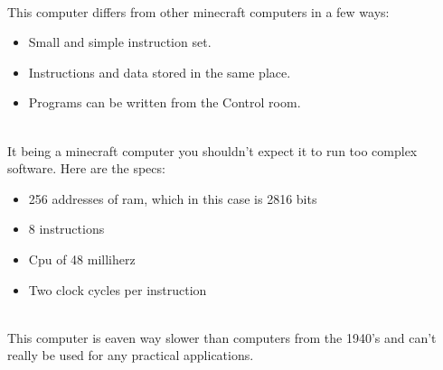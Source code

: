 \documentclass{article}
\begin{document}
~\\
This computer differs from other minecraft computers in a few ways:
\begin{itemize}
	\item Small and simple instruction set.
	\item Instructions and data stored in the same place.
	\item Programs can be written from the Control room.
\end{itemize}
~\\
It being a minecraft computer you shouldn't expect it to run too complex software. Here are the specs:
\begin{itemize}
	\item 256 addresses of ram, which in this case is 2816 bits
	\item 8 instructions
	\item Cpu of 48 milliherz
	\item Two clock cycles per instruction
\end{itemize}
~\\
This computer is eaven way slower than computers from the 1940's and can't really be used for any practical applications.
\end{document}
